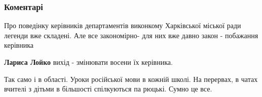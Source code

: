  
 
 
 
 
\subsubsection{Коментарі}
\label{sec:22_07_2021.fb.kuc_galina.1.mova_harkov_shkoly.cmt}

\begin{itemize}
 

Про поведінку керівників департаментів виконкому Харківської міської ради
легенди вже складені. Але все закономірно- для них вже давно закон - побажання
керівника

\begin{itemize}
 
\textbf{Лариса Лойко} вихід - змінювати восени їх керівника.
\end{itemize}

 

Так само і в області. Уроки російської мови в кожній школі. На перервах, в
чатах вчителі з дітьми в більшості спілкуються па рюцькі. Сумно це все.

\begin{itemize}
 

\end{itemize}
\end{itemize}
